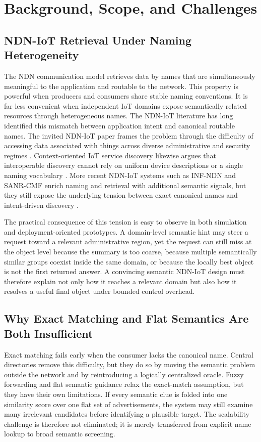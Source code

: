 \documentclass[journal]{IEEEtran}
\begin{document}
\section{Background, Scope, and Challenges}

\subsection{NDN-IoT Retrieval Under Naming Heterogeneity}

The NDN communication model retrieves data by names that are simultaneously meaningful to the application and routable to the network. This property is powerful when producers and consumers share stable naming conventions. It is far less convenient when independent IoT domains expose semantically related resources through heterogeneous names. The NDN-IoT literature has long identified this mismatch between application intent and canonical routable names. The invited NDN-IoT paper frames the problem through the difficulty of accessing data associated with things across diverse administrative and security regimes \cite{ndn_iot_invited}. Context-oriented IoT service discovery likewise argues that interoperable discovery cannot rely on uniform device descriptions or a single naming vocabulary \cite{context_iot}. More recent NDN-IoT systems such as INF-NDN and SANR-CMF enrich naming and retrieval with additional semantic signals, but they still expose the underlying tension between exact canonical names and intent-driven discovery \cite{inf_ndn,sanr}.

The practical consequence of this tension is easy to observe in both simulation and deployment-oriented prototypes. A domain-level semantic hint may steer a request toward a relevant administrative region, yet the request can still miss at the object level because the summary is too coarse, because multiple semantically similar groups coexist inside the same domain, or because the locally best object is not the first returned answer. A convincing semantic NDN-IoT design must therefore explain not only how it reaches a relevant domain but also how it resolves a useful final object under bounded control overhead.

\subsection{Why Exact Matching and Flat Semantics Are Both Insufficient}

Exact matching fails early when the consumer lacks the canonical name. Central directories remove this difficulty, but they do so by moving the semantic problem outside the network and by reintroducing a logically centralized oracle. Fuzzy forwarding and flat semantic guidance relax the exact-match assumption, but they have their own limitations. If every semantic clue is folded into one similarity score over one flat set of advertisements, the system may still examine many irrelevant candidates before identifying a plausible target. The scalability challenge is therefore not eliminated; it is merely transferred from explicit name lookup to broad semantic screening.
\end{document}
